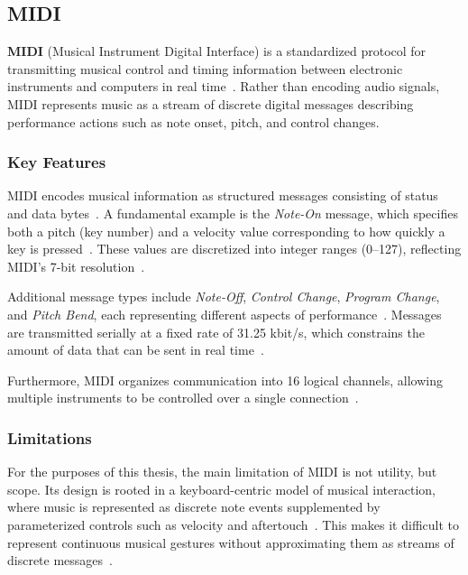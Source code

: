 \subsection{MIDI}\label{subsec:midi}

\textbf{MIDI} (Musical Instrument Digital Interface) is a standardized protocol for transmitting musical
control and timing information between electronic instruments and computers in real time~\cite{Moog_1986}.
Rather than encoding audio signals, MIDI represents music as a stream of discrete digital messages describing
performance actions such as note onset, pitch, and control changes.


\subsubsection{Key Features}

MIDI encodes musical information as structured messages consisting of status and data bytes~\cite{Moog_1986}.
A fundamental example is the \textit{Note-On} message, which specifies both a pitch (key number) and a
velocity value corresponding to how quickly a key is pressed~\cite{Moog_1986}.
These values are discretized into integer ranges (0–127), reflecting MIDI’s 7-bit resolution~\cite{Moog_1986}.

Additional message types include \textit{Note-Off}, \textit{Control Change}, \textit{Program Change}, and
\textit{Pitch Bend}, each representing different aspects of performance~\cite{Moog_1986}.
Messages are transmitted serially at a fixed rate of 31.25 kbit/s, which constrains the amount of data that
can be sent in real time~\cite{Moog_1986}.

Furthermore, MIDI organizes communication into 16 logical channels, allowing multiple instruments to be
controlled over a single connection~\cite{Moog_1986}.


\subsubsection{Limitations}

For the purposes of this thesis, the main limitation of MIDI is not utility, but scope.
Its design is rooted in a keyboard-centric model of musical interaction, where music is represented as
discrete note events supplemented by parameterized controls such as velocity and aftertouch~\cite{Moore_1988}.
This makes it difficult to represent continuous musical gestures without approximating them as streams of
discrete messages~\cite{Moore_1988}.


